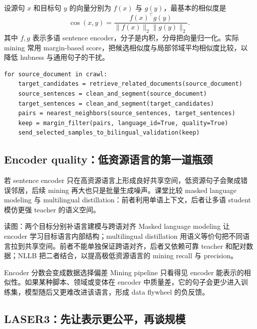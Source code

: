 设源句 $x$ 和目标句 $y$ 的向量分别为 $f(x)$ 与 $g(y)$，最基本的相似度是
\[
\operatorname{cos}(x,y)=\frac{f(x)^\top g(y)}{\lVert f(x)\rVert_2\lVert g(y)\rVert_2}.
\]
其中 $f,g$ 表示多语 sentence encoder，分子是内积，分母把向量归一化。实际 mining 常用 margin-based score，把候选相似度与局部邻域平均相似度比较，以降低 hubness 与通用句子的干扰。

\begin{lstlisting}[caption={句向量平行语料挖掘的概念流程}]
for source_document in crawl:
    target_candidates = retrieve_related_documents(source_document)
    source_sentences = clean_and_segment(source_document)
    target_sentences = clean_and_segment(target_candidates)
    pairs = nearest_neighbors(source_sentences, target_sentences)
    keep = margin_filter(pairs, language_id=True, quality=True)
    send_selected_samples_to_bilingual_validation(keep)
\end{lstlisting}

\subsection{Encoder quality：低资源语言的第一道瓶颈}

若 sentence encoder 只在高资源语言上形成良好共享空间，低资源句子会聚成错误邻居，后续 mining 再大也只是批量生成噪声。课堂比较 masked language modeling 与 multilingual distillation：前者利用单语上下文，后者让多语 student 模仿更强 teacher 的语义空间。


\begin{knowledgebox}{读图：两个目标分别补语言建模与跨语对齐}
Masked language modeling 让 encoder 学习目标语言内部结构；multilingual distillation 用语义等价句把不同语言拉到共享空间。前者不能单独保证跨语对齐，后者又依赖可靠 teacher 和配对数据；NLLB 把二者结合，以提高极低资源语言的 mining recall 与 precision。
\end{knowledgebox}

\begin{warningbox}{Encoder 分数会变成数据选择偏差}
Mining pipeline 只看得见 encoder 能表示的相似性。如果某种脚本、领域或变体在 encoder 中质量差，它的句子会更少进入训练集，模型随后又更难改进该语言，形成 data flywheel 的负反馈。
\end{warningbox}

\subsection{LASER3：先让表示更公平，再谈规模}


